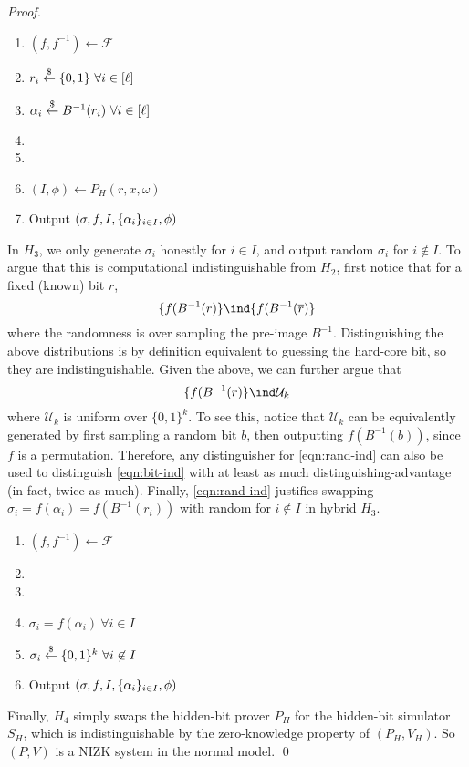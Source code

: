 \begin{proof}
\begin{enumerate}
    \item $(f, f^{-1}) \gets \mathcal{F}$
    \item $r_i \overset{\$}{\gets} \{0, 1\} ~\forall i \in [\ell]$
    \item $\alpha_i \overset{\$}{\gets} B^{-1}(r_i) ~\forall i \in [\ell]$
    \item {}
    \item {}
    \item $(I, \phi) \gets P_H(r, x, \omega)$
    \item Output $(\sigma, f, I, \{\alpha_i\}_{i \in I}, \phi)$
\end{enumerate}
In $H_3$, we only generate $\sigma_i$ honestly for $i \in I$, and output random
$\sigma_i$ for $i \not\in I$.
To argue that this is computational
indistinguishable from $H_2$, first notice that for a fixed (known) bit $r$,
\begin{equation}
\label{eqn:bit-ind}
\{f(B^{-1}(r)\} \ind \{f(B^{-1}(\overline r)\}
\end{equation}
where the randomness is over sampling the pre-image $B^{-1}$.
Distinguishing the above distributions is by definition equivalent to guessing the
hard-core bit, so they are indistinguishable.
Given the above, we can further argue that
\begin{equation}
\label{eqn:rand-ind}
\{f(B^{-1}(r)\} \ind \mathcal{U}_k
\end{equation}
where $\mathcal{U}_k$ is uniform over $\{0, 1\}^k$. To see this, notice
that $\mathcal{U}_k$ can be equivalently generated by first sampling a random
bit $b$, then outputting $f(B^{-1}(b))$, since $f$ is a permutation.
Therefore, any distinguisher for \eqref{eqn:rand-ind} can also be used to distinguish
\eqref{eqn:bit-ind} with at least as much distinguishing-advantage (in fact,
twice as much).
Finally, \eqref{eqn:rand-ind} justifies swapping $\sigma_i = f(\alpha_i) =
f(B^{-1}(r_i))$ with random for $i \not\in I$ in hybrid $H_3$.





\begin{enumerate}
    \item $(f, f^{-1}) \gets \mathcal{F}$
    \item {}
    \item {}
    \item $\sigma_i = f(\alpha_i) ~\forall i \in I$
    \item $\sigma_i \overset{\$}{\gets} \{0, 1\}^k ~\forall i \not\in I$
    \item Output $(\sigma, f, I, \{\alpha_i\}_{i \in I}, \phi)$
\end{enumerate}
Finally, $H_4$ simply swaps the hidden-bit prover $P_H$ for the hidden-bit simulator $S_H$,
which is indistinguishable by the zero-knowledge property of $(P_H, V_H)$.
So $(P, V)$ is a NIZK system in the normal model.
\qed

\end{proof}



